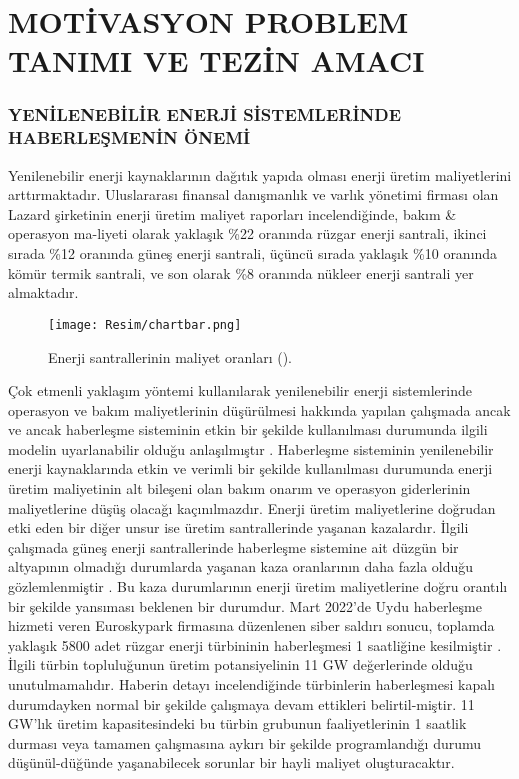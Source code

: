 \part{MOTİVASYON PROBLEM TANIMI VE TEZİN AMACI}
\thispagestyle{empty}
\newpage
\section{YENİLENEBİLİR ENERJİ SİSTEMLERİNDE HABERLEŞMENİN ÖNEMİ} \label{onem}




Yenilenebilir enerji kaynaklarının dağıtık yapıda olması enerji üretim maliyetlerini arttırmaktadır. Uluslararası finansal danışmanlık ve varlık yönetimi firması olan Lazard şirketinin enerji üretim maliyet raporları incelendiğinde, bakım \& operasyon ma-liyeti olarak yaklaşık \%22 oranında rüzgar enerji santrali, ikinci sırada \%12 oranında güneş enerji santrali, üçüncü sırada yaklaşık \%10 oranında kömür termik santrali, ve son olarak \%8 oranında nükleer enerji santrali yer almaktadır.


\begin{figure}[htbp]
\centerline{\texttt{[image: Resim/chartbar.png]}}
\caption{Enerji santrallerinin maliyet oranları (\protect{}).}
\label{fig:Lazards}
\end{figure}






Çok etmenli yaklaşım yöntemi kullanılarak yenilenebilir enerji sistemlerinde operasyon ve bakım maliyetlerinin düşürülmesi hakkında yapılan çalışmada ancak ve ancak haberleşme sisteminin etkin bir şekilde kullanılması durumunda ilgili modelin uyarlanabilir olduğu anlaşılmıştır \cite{7804974}. 
Haberleşme sisteminin yenilenebilir enerji kaynaklarında etkin ve verimli bir şekilde kullanılması durumunda enerji üretim maliyetinin alt bileşeni olan bakım onarım ve operasyon giderlerinin maliyetlerine düşüş olacağı kaçınılmazdır.
Enerji üretim maliyetlerine doğrudan etki eden bir diğer unsur ise üretim santrallerinde yaşanan kazalardır. İlgili çalışmada güneş enerji santrallerinde haberleşme sistemine ait düzgün bir altyapının olmadığı durumlarda yaşanan kaza oranlarının daha fazla olduğu gözlemlenmiştir \cite{https://doi.org/10.1002/dac.4517}. Bu kaza durumlarının enerji üretim maliyetlerine doğru orantılı bir şekilde yansıması beklenen bir durumdur.
Mart 2022'de Uydu haberleşme hizmeti veren Euroskypark firmasına düzenlenen siber saldırı sonucu, toplamda yaklaşık 5800 adet rüzgar enerji türbininin haberleşmesi 1 saatliğine kesilmiştir \cite{sibersaldiri}. İlgili türbin topluluğunun üretim potansiyelinin 11 GW değerlerinde olduğu unutulmamalıdır. Haberin detayı incelendiğinde türbinlerin haberleşmesi kapalı durumdayken normal bir şekilde çalışmaya devam ettikleri belirtil-miştir. 11 GW'lık üretim kapasitesindeki bu türbin grubunun faaliyetlerinin 1 saatlik durması veya tamamen çalışmasına aykırı bir şekilde programlandığı durumu düşünül-düğünde yaşanabilecek sorunlar bir hayli maliyet oluşturacaktır.




